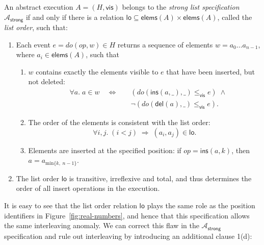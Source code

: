 \documentclass[sigconf]{acmart}
\begin{document}
\begin{displayquote}
  An abstract execution $A = (H, \textsf{vis})$ belongs to the \emph{strong list specification} $\mathcal{A}_\textsf{strong}$ if and only if there is a relation $\textsf{lo} \subseteq \textsf{elems}(A) \times \textsf{elems}(A)$, called the \emph{list order}, such that:
  \begin{enumerate}
    \item Each event $e = \mathit{do}(\mathit{op}, w) \in H$ returns a sequence of elements $w=a_0 \dots a_{n-1}$, where $a_i \in \textsf{elems}(A)$, such that
    \begin{enumerate}
      \item $w$ contains exactly the elements visible to $e$ that have been inserted, but not deleted:
	    \begin{align*}
          \quad\forall a.\; a \in w \quad\Longleftrightarrow\quad &
		  (\mathit{do}(\textsf{ins}(a, \_), \_) \le_\textsf{vis} e) \;\wedge\\ &
		  \neg(\mathit{do}(\textsf{del}(a), \_) \le_\textsf{vis} e).
		\end{align*}
      \item The order of the elements is consistent with the list order:
        \[ \forall i, j.\; (i < j) \;\Longrightarrow\; (a_i, a_j) \in \textsf{lo}. \]
      \item Elements are inserted at the specified position:
        if $\mathit{op} = \textsf{ins}(a, k)$, then $a = a_{\mathrm{min} \{k,\; n-1\}}$.
    \end{enumerate}
    \item The list order $\textsf{lo}$ is transitive, irreflexive and total, and thus determines the order of all insert operations in the execution.
  \end{enumerate}
\end{displayquote}
It is easy to see that the list order relation $\textsf{lo}$ plays the same role as the position identifiers in Figure~\ref{fig:real-numbers}, and hence that this specification allows the same interleaving anomaly.
We can correct this flaw in the $\mathcal{A}_\textsf{strong}$ specification and rule out interleaving by introducing an additional clause 1(d):
\end{document}

